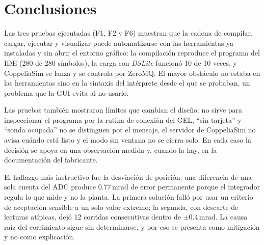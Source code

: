 \documentclass[12pt,letterpaper]{article}
\newcommand{\cod}[1]{\texttt{\detokenize{#1}}}
\newcommand{\mrad}{\,\mathrm{mrad}}
\begin{document}
\section{Conclusiones}

Las tres pruebas ejecutadas (F1, F2 y F6) muestran que la cadena de compilar, cargar, ejecutar y visualizar puede automatizarse con las herramientas ya instaladas y sin abrir el entorno gráfico: la compilación reproduce el programa del IDE (280 de 280 símbolos), la carga con \textit{DSLite} funcionó 10 de 10 veces, y CoppeliaSim se lanza y se controla por ZeroMQ. El mayor obstáculo no estaba en las herramientas sino en la sintaxis del intérprete desde el que se probaban, un problema que la GUI evita al no usarlo.

Las pruebas también mostraron límites que cambian el diseño: \cod{DSLite memory} no sirve para inspeccionar el programa por la rutina de conexión del GEL, ``sin tarjeta'' y ``sonda ocupada'' no se distinguen por el mensaje, el servidor de CoppeliaSim no avisa cuándo está listo y el modo sin ventana no se cierra solo. En cada caso la decisión se apoya en una observación medida y, cuando la hay, en la documentación del fabricante.

El hallazgo más instructivo fue la desviación de posición: una diferencia de una sola cuenta del ADC produce $0.77\mrad$ de error permanente porque el integrador regula lo que mide y no la planta. La primera solución falló por usar un criterio de aceptación sensible a un solo valor extremo; la segunda, con descarte de lecturas atípicas, dejó 12 corridas consecutivas dentro de $\pm 0.4\mrad$. La causa raíz del corrimiento sigue sin determinarse, y por eso se presenta como mitigación y no como explicación.
\end{document}
